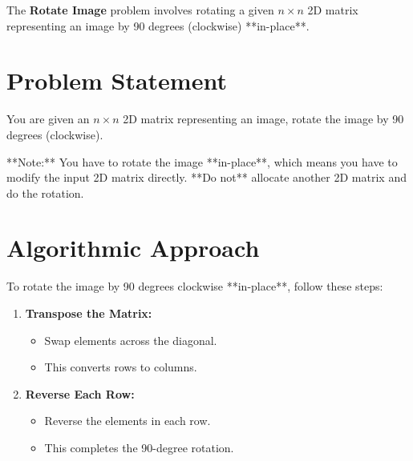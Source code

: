
\label{problem:rotate_image}

The \textbf{Rotate Image} problem involves rotating a given \( n \times n \) 2D matrix representing an image by 90 degrees (clockwise) **in-place**.

\section*{Problem Statement}
You are given an \( n \times n \) 2D matrix representing an image, rotate the image by 90 degrees (clockwise).

**Note:** You have to rotate the image **in-place**, which means you have to modify the input 2D matrix directly. **Do not** allocate another 2D matrix and do the rotation.


\section*{Algorithmic Approach}
To rotate the image by 90 degrees clockwise **in-place**, follow these steps:

\begin{enumerate}
    \item \textbf{Transpose the Matrix:}
    \begin{itemize}
        \item Swap elements across the diagonal.
        \item This converts rows to columns.
    \end{itemize}
    
    \item \textbf{Reverse Each Row:}
    \begin{itemize}
        \item Reverse the elements in each row.
        \item This completes the 90-degree rotation.
    \end{itemize}
\end{enumerate}

